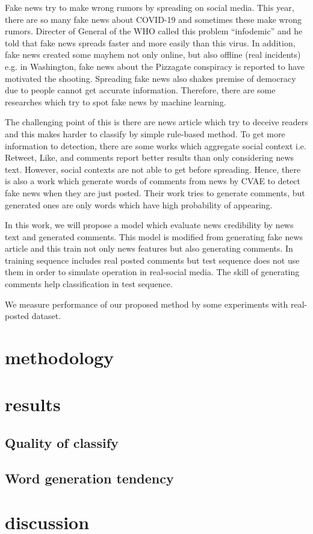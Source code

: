 \documentclass[conference]{IEEEtran}
\begin{document}
Fake news try to make wrong rumors by spreading on social media.
This year, there are so many fake news about COVID-19 and sometimes these make wrong rumors.
Directer of General of the WHO called this problem ``infodemic'' and he told that fake news spreads faster and more easily than this virus\cite{ZAROCOSTAS2020676}. 
In addition, fake news created some mayhem not only online, but also offline (real incidents)
e.g. in Washington, fake news about the Pizzagate conspiracy is reported to have motivated the shooting\cite{agencies_2016}.
Spreading fake news also shakes premise of democracy due to people cannot get accurate information.
Therefore, there are some researches which try to spot fake news by machine learning.

The challenging point of this is there are news article which try to deceive readers
and this makes harder to classify by simple rule-based method.
To get more information to detection,
there are some works which aggregate social context i.e. Retweet, Like, and comments
report better results than only considering news text\cite{Guo:2018:RDH:3269206.3271709}.
However, social contexts are not able to get before spreading.
Hence, there is also a work which generate words of comments from news by CVAE to detect fake news when they are just posted\cite{ijcai2018-533}.
Their work tries to generate comments, but generated ones are only words which have high probability of appearing.

In this work, we will propose a model which evaluate news credibility by news text and generated comments.
This model is modified from generating fake news article\cite{NIPS2019_9106} and this train not only news features but also generating comments.
In training sequence includes real posted comments but test sequence does not use them in order to simulate operation in real-social media.
The skill of generating comments help classification in test sequence.

We measure performance of our proposed method by some experiments with real-posted dataset.

\section{methodology}

\section{results}
\subsection{Quality of classify}
\subsection{Word generation tendency}
\section{discussion}



\end{document}

